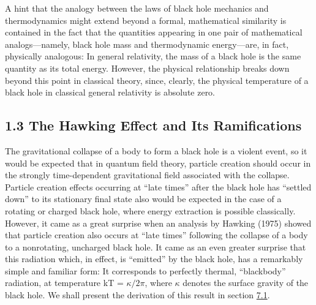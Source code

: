 \documentclass[11pt,a4paper]{article}
\begin{document}
A hint that the analogy between the laws of black hole mechanics and thermodynamics might extend beyond a formal, mathematical similarity is contained in the fact that the quantities appearing in one pair of mathematical analogs---namely, black hole mass and thermodynamic energy---are, in fact, physically analogous: In general relativity, the mass of a black hole is the same quantity \hypertarget{source-21}{} as its total energy. However, the physical relationship breaks down beyond this point in classical theory, since, clearly, the physical temperature of a black hole in classical general relativity is absolute zero.

\subsection*{1.3 The Hawking Effect and Its Ramifications}\hypertarget{sec:1.3}{}

The gravitational collapse of a body to form a black hole is a violent event, so it would be expected that in quantum field theory, particle creation should occur in the strongly time-dependent gravitational field associated with the collapse. Particle creation effects occurring at ``late times'' after the black hole has ``settled down'' to its stationary final state also would be expected in the case of a rotating or charged black hole, where energy extraction is possible classically. However, it came as a great surprise when an analysis by Hawking (1975) showed that particle creation also occurs at ``late times'' following the collapse of a body to a nonrotating, uncharged black hole. It came as an even greater surprise that this radiation which, in effect, is ``emitted'' by the black hole, has a remarkably simple and familiar form: It corresponds to perfectly thermal, ``blackbody'' radiation, at temperature kT = \(\kappa/2\pi\), where \(\kappa\) denotes the surface gravity of the black hole. We shall present the derivation of this result in section \hyperlink{sec:7.1}{7.1}.
\end{document}
